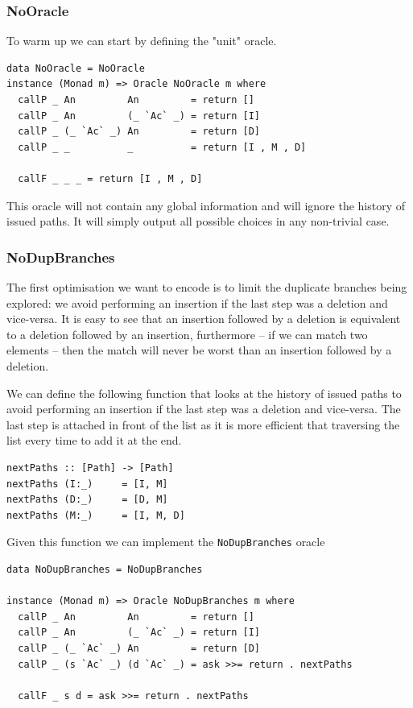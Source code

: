 \documentclass[11pt, titlepage]{article}
\begin{document}
\subsubsection{NoOracle}
To warm up we can start by defining the "unit" oracle. 

\begin{verbatim}
data NoOracle = NoOracle
instance (Monad m) => Oracle NoOracle m where
  callP _ An         An         = return []
  callP _ An         (_ `Ac` _) = return [I]
  callP _ (_ `Ac` _) An         = return [D]
  callP _ _          _          = return [I , M , D]

  callF _ _ _ = return [I , M , D]
\end{verbatim}

This oracle will not contain any global information and will ignore the history of issued paths. It will simply output all possible choices in any non-trivial case.

\subsubsection{NoDupBranches}

The first optimisation we want to encode is to limit the duplicate branches being explored: we avoid performing an insertion if the last step was a deletion and vice-versa.
It is easy to see that an insertion followed by a deletion is equivalent to a deletion followed by an insertion, furthermore -- if we can match two elements -- then the match will never be worst than an insertion followed by a deletion.

We can define the following function that looks at the history of issued paths to avoid performing an insertion if the last step was a deletion and vice-versa. The last step is attached in front of the list as it is more efficient that traversing the list every time to add it at the end.

\begin{verbatim}
nextPaths :: [Path] -> [Path]
nextPaths (I:_)     = [I, M]
nextPaths (D:_)     = [D, M]
nextPaths (M:_)     = [I, M, D]
\end{verbatim}

Given this function we can implement the \texttt{NoDupBranches} oracle

\begin{verbatim}
data NoDupBranches = NoDupBranches

instance (Monad m) => Oracle NoDupBranches m where
  callP _ An         An         = return []
  callP _ An         (_ `Ac` _) = return [I]
  callP _ (_ `Ac` _) An         = return [D]
  callP _ (s `Ac` _) (d `Ac` _) = ask >>= return . nextPaths

  callF _ s d = ask >>= return . nextPaths
\end{verbatim}
\end{document}
